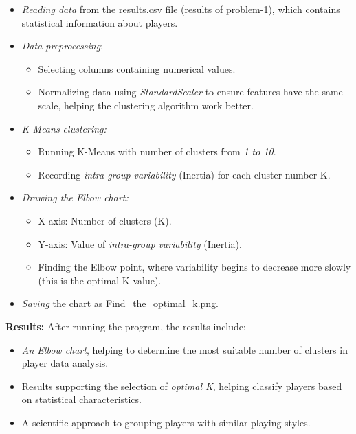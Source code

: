 \documentclass[12pt]{article}
\begin{document}
\begin{itemize}
    \item \textit{Reading data} from the results.csv file (results of problem-1), which contains statistical information about players.
    \item \textit{Data preprocessing}:
    
    \begin{itemize}
        \item Selecting columns containing numerical values.
        \item Normalizing data using \textit{StandardScaler} to ensure features have the same scale, helping the clustering algorithm work better.
    \end{itemize}
    
    \item \textit{K-Means clustering:}
    
    \begin{itemize}
        \item Running K-Means with number of clusters from \textit{1 to 10}.
        \item Recording \textit{intra-group variability} (Inertia) for each cluster number K.
    \end{itemize}
    
    \item \textit{Drawing the Elbow chart:}
    
    \begin{itemize}
        \item X-axis: Number of clusters (K).
        \item Y-axis: Value of \textit{intra-group variability} (Inertia).
        \item Finding the Elbow point, where variability begins to decrease more slowly (this is the optimal K value).
    \end{itemize}
    
    \item \textit{Saving} the chart as Find\_the\_optimal\_k.png.
\end{itemize}

\textbf{Results:} After running the program, the results include:

\begin{itemize}
    \item \textit{An Elbow chart}, helping to determine the most suitable number of clusters in player data analysis.
    \item Results supporting the selection of \textit{optimal K}, helping classify players based on statistical characteristics.
    \item A scientific approach to grouping players with similar playing styles.
\end{itemize}
\end{document}

